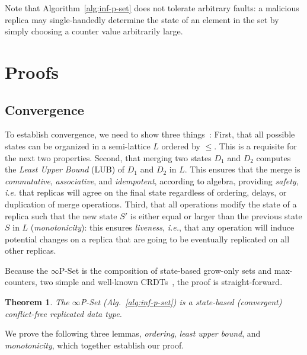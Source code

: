 \documentclass[11pt, oneside]{article}   	%
\newtheorem{theorem}{Theorem}
\begin{document}
Note that Algorithm~\ref{alg:inf-p-set} does not tolerate arbitrary faults: a malicious replica may single-handedly determine the state of an element in the set by simply choosing a counter value arbitrarily large.

\section{Proofs}
\label{sec:proofs}

\subsection{Convergence}

To establish convergence, we need to show three things~\cite{shapiro:hal-00932836}: First, that all possible states can be organized in a semi-lattice $L$ ordered by $\leq$. This is a requisite for the next two properties. Second, that merging two states $D_1$ and $D_2$ computes the \textit{Least Upper Bound} (LUB) of $D_1$ and $D_2$ in $L$. This ensures that the merge is \textit{commutative}, \textit{associative}, and \textit{idempotent}, according to algebra, providing \textit{safety}, \textit{i.e.} that replicas will agree on the final state regardless of ordering, delays, or duplication of merge operations. Third, that all operations modify the state of a replica such that the new state $S'$ is either equal or larger than the previous state $S$ in $L$ (\textit{monotonicity}): this ensures \textit{liveness}, \textit{i.e.}, that any operation will induce potential changes on a replica that are going to be eventually replicated on all other replicas. 

Because the $\infty$P-Set is the composition of state-based grow-only sets and max-counters, two simple and well-known CRDTs~\cite{shapiro:inria-00555588}, the proof is straight-forward.


\begin{theorem}
\label{proof:state-crdt}
The $\infty$P-Set (Alg.~\ref{alg:inf-p-set}) is a state-based (convergent) conflict-free replicated data type.
\end{theorem}

We prove the following three lemmas, \textit{ordering}, \textit{least upper bound}, and \textit{monotonicity}, which together establish our proof.
\end{document}

